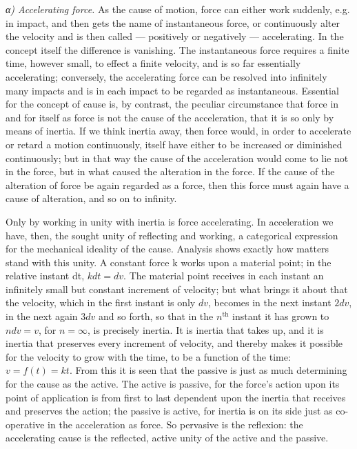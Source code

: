 \documentclass[12pt,a4paper]{book}
\newcommand{\subrunin}[1]{\emph{#1}\hspace{0.4em}}
\begin{document}
\subrunin{α) Accelerating force.} As the cause of motion, force can either work suddenly,
e.g. in impact, and then gets the name of instantaneous force, or continuously alter the
velocity and is then called --- positively or negatively --- accelerating. In the concept
itself the difference is vanishing. The instantaneous force requires a finite time, however
small, to effect a finite velocity, and is so far
essentially accelerating; conversely, the accelerating force can be resolved into
infinitely many impacts and is in each impact to be regarded as instantaneous. Essential
for the concept of cause is, by contrast, the peculiar circumstance that force in and for
itself as force is not the cause of the acceleration, that it is so only by means of
inertia. If we think inertia away, then force would, in order to accelerate or retard a
motion continuously, itself have either to be increased or diminished continuously; but in
that way the cause of the acceleration would come to lie not in the force, but in what
caused the alteration in the force. If the cause of the alteration of force be again
regarded as a force, then this force must again have a cause of alteration, and so on to
infinity.

Only by working in unity with inertia is force accelerating. In acceleration we have, then,
the sought unity of reflecting and working, a categorical expression for the mechanical
ideality of the cause. Analysis shows exactly how matters stand with this unity. A constant
force k works upon a material point; in the relative instant dt, $kdt = dv$. The material
point receives in each instant an infinitely small but constant increment of velocity; but
what brings it about that the velocity, which in the first instant is only $dv$, becomes in
the next instant $2dv$, in the next again $3dv$ and so forth, so that in the
$n^{\text{th}}$ instant it has grown to $ndv = v$, for $n = \infty$, is precisely inertia.
It is inertia that takes up, and it is inertia that preserves every increment of velocity,
and thereby makes it possible for the velocity to grow with the time, to be a function of
the time: $v = f(t) = kt$. From this it is seen that the passive is just as much
determining for the cause as the active. The active is passive, for the force's action upon
its point of application is from first to last dependent upon the inertia that receives and
preserves the action; the passive is active, for inertia is on its side just as
co-operative in the acceleration as force.
So pervasive is the reflexion: the accelerating cause is the reflected, active unity of the
active and the passive.
\end{document}
